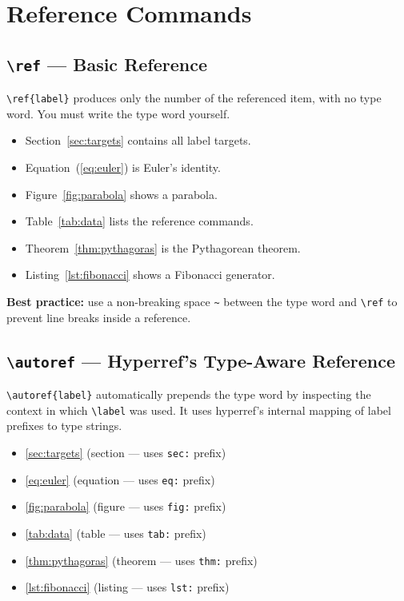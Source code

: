 \documentclass[12pt,a4paper]{article}
\begin{document}

\section{Reference Commands}
\label{sec:refcmds}

\subsection{\texttt{\textbackslash ref} — Basic Reference}
\label{subsec:ref}

\verb|\ref{label}| produces only the number of the referenced item, with no
type word.  You must write the type word yourself.

\begin{itemize}
    \item Section~\ref{sec:targets} contains all label targets.
    \item Equation~(\ref{eq:euler}) is Euler's identity.
    \item Figure~\ref{fig:parabola} shows a parabola.
    \item Table~\ref{tab:data} lists the reference commands.
    \item Theorem~\ref{thm:pythagoras} is the Pythagorean theorem.
    \item Listing~\ref{lst:fibonacci} shows a Fibonacci generator.
\end{itemize}

\noindent\textbf{Best practice:} use a non-breaking space \verb|~| between
the type word and \verb|\ref| to prevent line breaks inside a reference.

\subsection{\texttt{\textbackslash autoref} — Hyperref's Type-Aware Reference}
\label{subsec:autoref}

\verb|\autoref{label}| automatically prepends the type word by inspecting
the context in which \verb|\label| was used.  It uses hyperref's internal
mapping of label prefixes to type strings.

\begin{itemize}
    \item \autoref{sec:targets} (section — uses \texttt{sec:} prefix)
    \item \autoref{eq:euler} (equation — uses \texttt{eq:} prefix)
    \item \autoref{fig:parabola} (figure — uses \texttt{fig:} prefix)
    \item \autoref{tab:data} (table — uses \texttt{tab:} prefix)
    \item \autoref{thm:pythagoras} (theorem — uses \texttt{thm:} prefix)
    \item \autoref{lst:fibonacci} (listing — uses \texttt{lst:} prefix)
\end{itemize}
\end{document}
